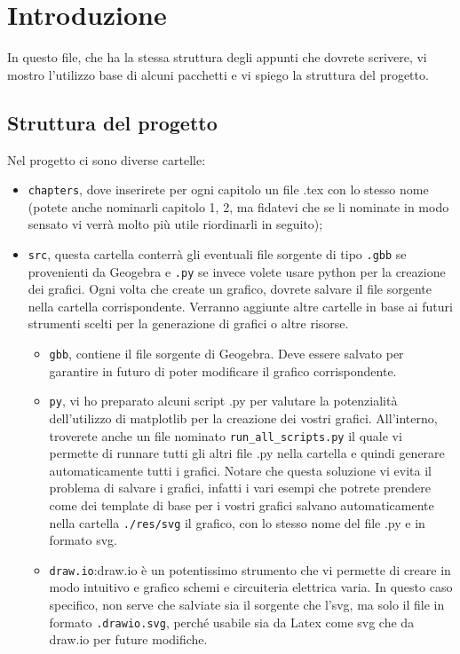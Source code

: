 \chapter{Introduzione}

In questo file, che ha la stessa struttura degli appunti che dovrete scrivere, vi mostro l'utilizzo base di alcuni pacchetti e vi spiego la struttura del progetto.

\section{Struttura del progetto}

Nel progetto ci sono diverse cartelle:
\begin{itemize}
	\item \texttt{chapters}, dove inserirete per ogni capitolo un file .tex con lo stesso nome (potete anche nominarli capitolo 1, 2, ma fidatevi che se li nominate in modo sensato vi verrà molto più utile riordinarli in seguito);
	\item \texttt{src}, questa cartella conterrà gli eventuali file sorgente di tipo \texttt{.gbb} se provenienti da Geogebra e  \texttt{.py} se invece volete usare python per la creazione dei grafici. Ogni volta che create un grafico, dovrete salvare il file sorgente nella cartella corrispondente. Verranno aggiunte altre cartelle in base ai futuri strumenti scelti per la generazione di grafici o altre risorse. 
	\begin{itemize}
		\item \texttt{gbb}, contiene il file sorgente di Geogebra. Deve essere salvato per garantire in futuro di poter modificare il grafico corrispondente.
		\item \texttt{py}, vi ho preparato alcuni script .py per valutare la potenzialità dell'utilizzo di matplotlib per la creazione dei vostri grafici. All'interno, troverete anche un file nominato \texttt{run\_all\_scripts.py} il quale vi permette di runnare tutti gli altri file .py nella cartella e quindi generare automaticamente tutti i grafici. Notare che questa soluzione vi evita il problema di salvare i grafici, infatti i vari esempi che potrete prendere come dei template di base per i vostri grafici salvano automaticamente nella cartella \texttt{./res/svg} il grafico, con lo stesso nome del file .py e in formato svg.
		\item \texttt{draw.io}:draw.io è un potentissimo strumento che vi permette di creare in modo intuitivo e grafico schemi e circuiteria elettrica varia. In questo caso specifico, non serve che salviate sia il sorgente che l'svg, ma solo il file in formato \texttt{.drawio.svg}, perché usabile sia da Latex come svg che da draw.io per future modifiche.

\end{itemize}
\end{itemize}
